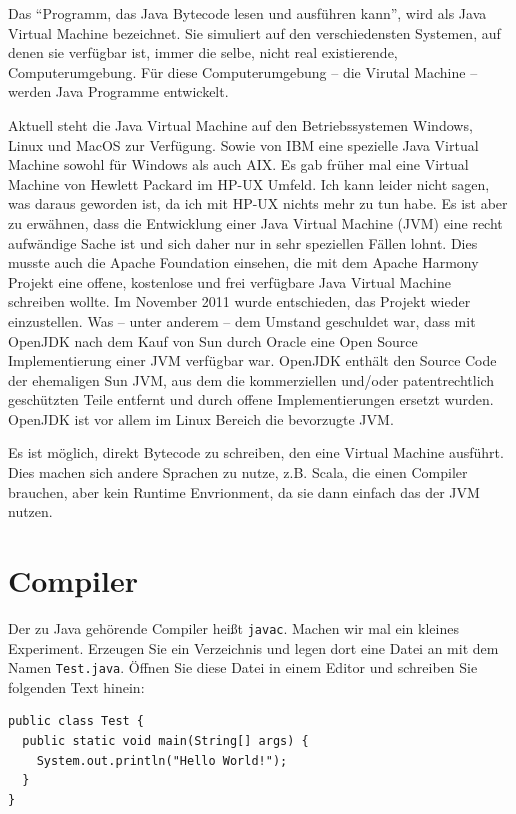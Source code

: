 Das "`Programm, das Java Bytecode lesen und ausführen kann"', wird als Java Virtual Machine bezeichnet. Sie simuliert auf den verschiedensten Systemen, auf denen sie verfügbar ist, immer die selbe, nicht real existierende, Computerumgebung. Für diese Computerumgebung -- die Virutal Machine -- werden Java Programme entwickelt. 

Aktuell steht die Java Virtual Machine auf den Betriebssystemen Windows, Linux und MacOS zur Verfügung. Sowie von IBM eine spezielle Java Virtual Machine sowohl für Windows als auch AIX. Es gab früher mal eine Virtual Machine von Hewlett Packard im HP-UX Umfeld. Ich kann leider nicht sagen, was daraus geworden ist, da ich mit HP-UX nichts mehr zu tun habe. Es ist aber zu erwähnen, dass die Entwicklung einer Java Virtual Machine (JVM) eine recht aufwändige Sache ist und sich daher nur in sehr speziellen Fällen lohnt. Dies musste auch die Apache Foundation einsehen, die mit dem Apache Harmony Projekt eine offene, kostenlose und frei verfügbare Java Virtual Machine schreiben wollte. Im November 2011 wurde entschieden, das Projekt wieder einzustellen. Was -- unter anderem -- dem Umstand geschuldet war, dass mit OpenJDK nach dem Kauf von Sun durch Oracle eine Open Source Implementierung einer JVM verfügbar war. OpenJDK enthält den Source Code der ehemaligen Sun JVM, aus dem die kommerziellen und/oder patentrechtlich geschützten Teile entfernt und durch offene Implementierungen ersetzt wurden. OpenJDK ist vor allem im Linux Bereich die bevorzugte JVM.

Es ist möglich, direkt Bytecode zu schreiben, den eine Virtual Machine ausführt. Dies machen sich andere Sprachen zu nutze, z.B. Scala, die einen Compiler brauchen, aber kein Runtime Envrionment, da sie dann einfach das der JVM nutzen. 

\section{Compiler}

Der zu Java gehörende Compiler heißt \texttt{javac}. Machen wir mal ein kleines Experiment. Erzeugen Sie ein Verzeichnis und legen dort eine Datei an mit dem Namen \texttt{Test.java}. Öffnen Sie diese Datei in einem Editor und schreiben Sie folgenden Text hinein:

\begin{lstlisting}
public class Test {
  public static void main(String[] args) {
    System.out.println("Hello World!");
  }
}
\end{lstlisting}\label{code:test}

